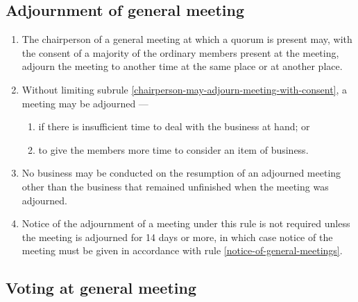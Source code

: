 \documentclass[../constitution.tex]{subfiles}
\begin{document}
\hypertarget{adjournment-of-general-meeting}{%
  \subsection{Adjournment of general meeting}\label{adjournment-of-general-meeting}}

\begin{enumerate}

  \item The chairperson of a general meeting at which a quorum is present may, with the consent of a majority of the ordinary members present at the meeting, adjourn the meeting to another time at the same place or at another place. \label{chairperson-may-adjourn-meeting-with-consent}
  \item Without limiting subrule \ref{chairperson-may-adjourn-meeting-with-consent}, a meeting may be adjourned ---

        \begin{enumerate}

          \item if there is insufficient time to deal with the business at hand; or
          \item to give the members more time to consider an item of business.
        \end{enumerate}
  \item No business may be conducted on the resumption of an adjourned meeting other than the business that remained unfinished when the meeting was adjourned.
  \item Notice of the adjournment of a meeting under this rule is not required unless the meeting is adjourned for 14 days or more, in which case notice of the meeting must be given in accordance with rule \ref{notice-of-general-meetings}.
\end{enumerate}

\hypertarget{voting-at-general-meeting}{%
  \subsection{Voting at general meeting}\label{voting-at-general-meeting}}
\end{document}
